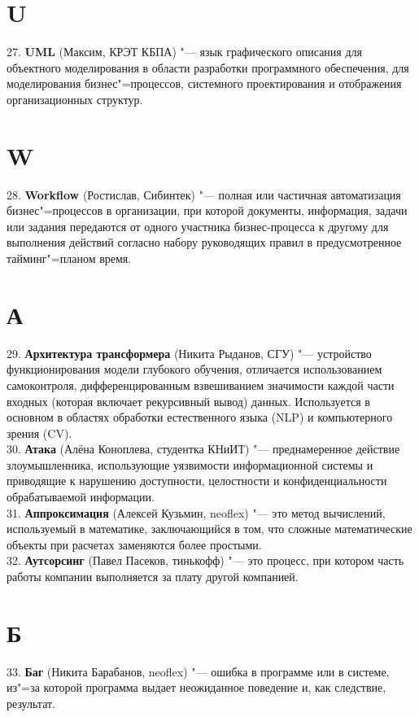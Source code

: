 \documentclass[14 pt]{extarticle}
\begin{document}
\section*{U}
    27. \textbf{UML} (Максим, КРЭТ КБПА) "--- язык графического описания для объектного моделирования в области разработки программного обеспечения, для моделирования бизнес"=процессов, системного проектирования и отображения организационных структур. \\

\section*{W}
    28. \textbf{Workflow} (Ростислав, Сибинтек) "--- полная или частичная автоматизация бизнес"=процессов в организации, при которой документы, информация, задачи или задания передаются от одного участника бизнес-процесса к другому для выполнения действий согласно набору руководящих правил в предусмотренное тайминг"=планом время. \\

\section*{А}
    29. \textbf{Архитектура трансформера} (Никита Рыданов, СГУ) "--- устройство функционирования модели глубокого обучения, отличается использованием самоконтроля, дифференцированным взвешиванием значимости каждой части входных (которая включает рекурсивный вывод) данных. Используется в основном в областях обработки естественного языка (NLP) и компьютерного зрения (CV). \\
    
    30. \textbf{Атака} (Алёна Коноплева, студентка КНиИТ) "--- преднамеренное действие злоумышленника, использующие уязвимости информационной системы и приводящие к нарушению доступности, целостности и конфиденциальности обрабатываемой информации.\\
    
    31. \textbf{Аппроксимация} (Алексей Кузьмин, neoflex) "--- это метод вычислений, используемый в математике, заключающийся в том, что сложные математические объекты при расчетах заменяются более простыми. \\

    32. \textbf{Аутсорсинг} (Павел Пасеков, тинькофф) "--- это процесс, при котором часть работы компании выполняется за плату другой компанией. \\
    
\section*{Б}
    33. \textbf{Баг} (Никита Барабанов, neoflex) "--- ошибка в программе или в системе, из"=за которой программа выдает неожиданное поведение и, как следствие, результат. \\
    
\end{document}
